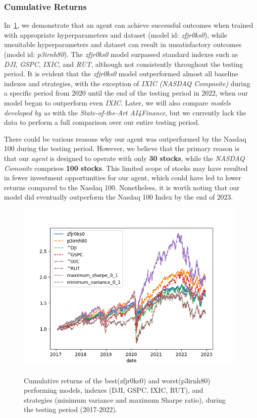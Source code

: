 \documentclass[../xlapes02]{subfiles}
\begin{document}
    \subsubsection{Cumulative Returns}
    In~\cref{fig:cumulative_return}, we demonstrate that an agent can achieve successful outcomes when trained with appropriate hyperparameters and dataset (model id: \emph{zfjr0ks0}), while unsuitable hyperparameters and dataset can result in unsatisfactory outcomes (model id: \emph{p3irnh80}). The \emph{zfjr0ks0} model surpassed standard indexes such as \emph{DJI}, \emph{GSPC}, \emph{IXIC}, and \emph{RUT}, although not consistently throughout the testing period. It is evident that the \emph{zfjr0ks0} model outperformed almost all baseline indexes and strategies, with the exception of \emph{IXIC (NASDAQ Composite)} during a specific period from 2020 until the end of the testing period in 2022, when our model began to outperform even \emph{IXIC}. Later, we will also compare \emph{models developed by us} with the \emph{State-of-the-Art AI4Finance}, but we currently lack the data to perform a full comparison over our entire testing period.

    There could be various reasons why our agent was outperformed by the Nasdaq 100 during the testing period. However, we believe that the primary reason is that our \emph{agent} is designed to operate with only \textbf{30 stocks}, while the \emph{NASDAQ Comosite} comprises \textbf{100 stocks}. This limited scope of stocks may have resulted in fewer investment opportunities for our agent, which could have led to lower returns compared to the Nasdaq 100. Nonetheless, it is worth noting that our model did eventually outperform the Nasdaq 100 Index by the end of 2023.
    \begin{figure}[h!]
        \centering
        \includegraphics[width=\linewidth]{image/figure/returns}
        \label{fig:cumulative_return}
        \caption{Cumulative returns of the best(zfjr0ks0) and worst(p3irnh80) performing models, indexes (DJI, GSPC, IXIC, RUT), and strategies (minimum variance and maximum Sharpe ratio), during the testing period (2017-2022).}
    \end{figure}
\end{document}
